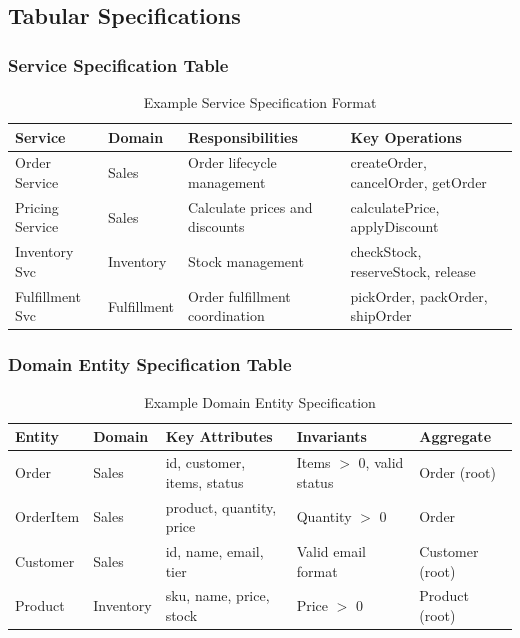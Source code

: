 \documentclass[11pt,letterpaper]{article}
\begin{document}
\subsection{Tabular Specifications}

\subsubsection{Service Specification Table}

\begin{table}[H]
\centering
\caption{Example Service Specification Format}
\small
\begin{tabular}{@{}L{2.2cm}L{2.5cm}L{4cm}L{3.8cm}@{}}
\toprule
\textbf{Service} & \textbf{Domain} & \textbf{Responsibilities} & \textbf{Key Operations} \\
\midrule
Order Service & Sales & Order lifecycle management & createOrder, cancelOrder, getOrder \\
\addlinespace
Pricing Service & Sales & Calculate prices and discounts & calculatePrice, applyDiscount \\
\addlinespace
Inventory Svc & Inventory & Stock management & checkStock, reserveStock, release \\
\addlinespace
Fulfillment Svc & Fulfillment & Order fulfillment coordination & pickOrder, packOrder, shipOrder \\
\bottomrule
\end{tabular}
\end{table}

\subsubsection{Domain Entity Specification Table}

\begin{table}[H]
\centering
\caption{Example Domain Entity Specification}
\small
\begin{tabular}{@{}L{2cm}L{2cm}L{3cm}L{3cm}L{2.5cm}@{}}
\toprule
\textbf{Entity} & \textbf{Domain} & \textbf{Key Attributes} & \textbf{Invariants} & \textbf{Aggregate} \\
\midrule
Order & Sales & id, customer, items, status & Items $>$ 0, valid status & Order (root) \\
\addlinespace
OrderItem & Sales & product, quantity, price & Quantity $>$ 0 & Order \\
\addlinespace
Customer & Sales & id, name, email, tier & Valid email format & Customer (root) \\
\addlinespace
Product & Inventory & sku, name, price, stock & Price $>$ 0 & Product (root) \\
\bottomrule
\end{tabular}
\end{table}
\end{document}
